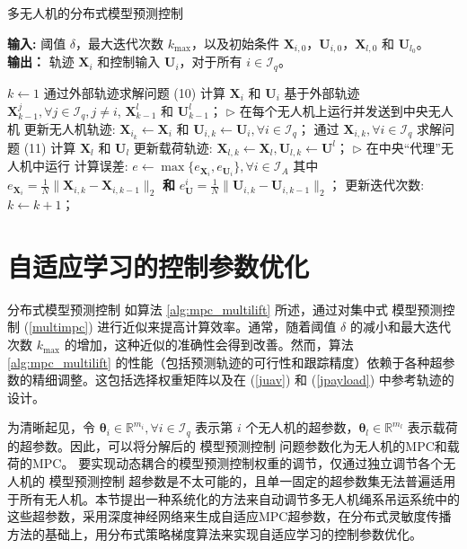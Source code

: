\documentclass[lang=chs, degree=master, blindreview=true, winfonts=true]{yanputhesis}
\begin{document}
\begin{algorithm}[h]
	\caption{多无人机的分布式模型预测控制}
	\label{alg:mpc_multilift}
	\textbf{输入:} 阈值 $\delta$，最大迭代次数 $k_{\text{max}}$，以及初始条件 $\bm{X}_{i,0}$，$\bm{U}_{i,0}$，$\bm{X}_{l,0}$ 和 $\bm{U}_{l_0}$。\\
	\textbf{输出：} 轨迹 $\bm{X}_i$ 和控制输入 $\bm{U}_i$，对于所有 $i \in \mathcal{I}_q$。
	
	\begin{algorithmic}[1]
	\State $k \gets 1$
			\State 通过外部轨迹求解问题 (10) 计算 $\bm{X}_i$ 和 $\bm{U}_i$
			\Statex \quad 基于外部轨迹 $\bm{X}^j_{k-1}, \forall j \in \mathcal{I}_q, j \neq i$, $\bm{X}^l_{k-1}$ 和 $\bm{U}^l_{k-1}$；
			\Statex \quad $\triangleright$ 在每个无人机上运行并发送到中央无人机
		\EndFor
		\State 更新无人机轨迹: $\bm{X}_{i_k} \gets \bm{X}_i$ 和 $\bm{U}_{i,k} \gets \bm{U}_i, \forall i \in \mathcal{I}_q$；
		\State 通过 $\bm{X}_{i,k}, \forall i \in \mathcal{I}_q$ 求解问题 (11) 计算 $\bm{X}_l$ 和 $\bm{U}_l$
		\State 更新载荷轨迹: $\bm{X}_{l,k} \gets \bm{X}_l, \bm{U}_{l,k} \gets \bm{U}^l$；
		\Statex \quad $\triangleright$ 在中央“代理”无人机中运行
		\State 计算误差: $e \gets \max \{ e_{\bm{X}_i}, e_{\bm{U}_i} \}, \forall i \in \mathcal{I}_A$ 
		\Statex \quad 其中 $e_{\bm{X}_i} = \frac{1}{N} \| \bm{X}_{i,k} - \bm{X}_{i,{k-1}} \|_2$ \textbf{和} 
		\Statex \quad $e^i_{\bm{U}} = \frac{1}{N} \| \bm{U}_{i,k} - \bm{U}_{i,{k-1}} \|_2$；
		\State 更新迭代次数: $k \gets k + 1$；
	\EndWhile
	\end{algorithmic}
\end{algorithm}

\section{自适应学习的控制参数优化}

分布式模型预测控制 如算法 \ref{alg:mpc_multilift} 所述，通过对集中式 模型预测控制 (\ref{multimpc}) 进行近似来提高计算效率。通常，随着阈值 \(\delta\) 的减小和最大迭代次数 \(k_{\text{max}}\) 的增加，这种近似的准确性会得到改善。然而，算法 \ref{alg:mpc_multilift} 的性能（包括预测轨迹的可行性和跟踪精度）依赖于各种超参数的精细调整。这包括选择权重矩阵以及在 (\ref{juav}) 和 (\ref{jpayload}) 中参考轨迹的设计。

为清晰起见，令 \(\bm \theta_i \in \mathbb{R}^{m_i}, \forall i \in \mathcal{I}_q\) 表示第 \(i\) 个无人机的超参数，\(\bm \theta_l \in \mathbb{R}^{m_l}\) 表示载荷的超参数。因此，可以将分解后的 模型预测控制 问题参数化为无人机的MPC和载荷的MPC。
要实现动态耦合的模型预测控制权重的调节，仅通过独立调节各个无人机的 模型预测控制 超参数是不太可能的，且单一固定的超参数集无法普遍适用于所有无人机。本节提出一种系统化的方法来自动调节多无人机绳系吊运系统中的这些超参数，采用深度神经网络来生成自适应MPC超参数，在分布式灵敏度传播方法的基础上，用分布式策略梯度算法来实现自适应学习的控制参数优化。
\end{document}
